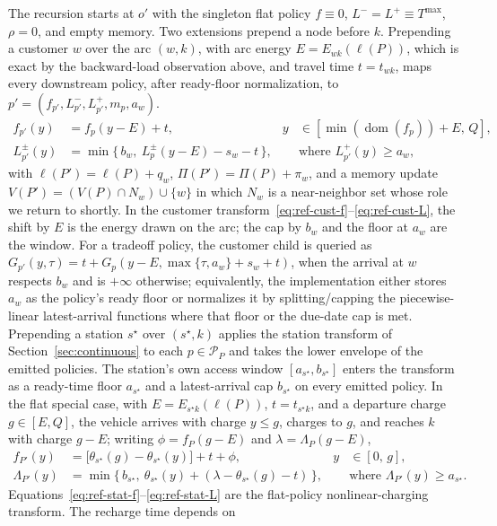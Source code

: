 \documentclass[review,3p,authoryear]{elsarticle}
\theoremstyle{plain}
\theoremstyle{definition}
\theoremstyle{remark}
\newcommand{\dom}{\operatorname{dom}}
\newcommand{\Tmax}{T^{\max}}
\begin{document}
The recursion starts at $o'$ with the singleton flat policy
$f\equiv0$, $L^-=L^+\equiv\Tmax$, $\rho=0$, and empty memory. Two extensions prepend
a node before $k$. Prepending a customer $w$ over the arc $(w,k)$, with arc energy
$E=E_{wk}(\ell(P))$, which is exact by the backward-load observation above, and
travel time $t=t_{wk}$, maps every downstream policy, after ready-floor
normalization, to
$p'=(f_{p'},L_{p'}^-,L_{p'}^+,m_p,a_w)$.
\begin{align}
f_{p'}(y) &= f_p(y-E) + t, & y &\in [\min(\dom(f_p))+E,\,Q],\label{eq:ref-cust-f}\\
L_{p'}^\pm(y) &= \min\{\,b_w,\ L_p^\pm(y-E)-s_w-t\,\}, &&\text{where } L_{p'}^+(y)\ge a_w,
  \label{eq:ref-cust-L}
\end{align}
with $\ell(P')=\ell(P)+q_w$, $\Pi(P')=\Pi(P)+\pi_w$, and a memory update
$V(P')=(V(P)\cap N_w)\cup\{w\}$ in which $N_w$ is a near-neighbor set whose role we
return to shortly. In the customer transform~\eqref{eq:ref-cust-f}--\eqref{eq:ref-cust-L},
the shift by $E$ is the energy drawn on the arc; the cap by $b_w$
and the floor at $a_w$ are the window. For a tradeoff policy, the customer child is
queried as $G_{p'}(y,\tau)=t+G_p(y-E,\max\{\tau,a_w\}+s_w+t)$, when the arrival at $w$ respects $b_w$ and is $+\infty$ otherwise; equivalently, the
implementation either stores $a_w$ as the policy's ready floor or normalizes it by
splitting/capping the piecewise-linear latest-arrival functions where that floor
or the due-date cap is met. Prepending a station $s^\star$ over
$(s^\star,k)$ applies the station
transform of Section~\ref{sec:continuous} to each $p\in\mathcal P_P$ and takes the
lower envelope of the emitted policies. The station's own access window
$[a_{s^\star},b_{s^\star}]$ enters the transform as a ready-time floor $a_{s^\star}$ and
a latest-arrival cap $b_{s^\star}$ on every emitted policy. In the
flat special case, with $E=E_{s^\star k}(\ell(P))$, $t=t_{s^\star k}$, and a
departure charge $g\in[E,Q]$, the vehicle arrives with charge \(y\le g\), charges to
$g$, and reaches $k$ with charge $g-E$; writing $\phi=f_P(g-E)$ and
$\lambda=\Lambda_P(g-E)$,
\begin{align}
f_{P'}(y) &= \bigl[\theta_{s^\star}(g)-\theta_{s^\star}(y)\bigr]+t+\phi,
  & y &\in[0,\,g],\label{eq:ref-stat-f}\\
\Lambda_{P'}(y) &= \min\{\,b_{s^\star},\ \theta_{s^\star}(y)+(\lambda-\theta_{s^\star}(g)-t)\,\},
  &&\text{where } \Lambda_{P'}(y)\ge a_{s^\star}.\label{eq:ref-stat-L}
\end{align}
Equations~\eqref{eq:ref-stat-f}--\eqref{eq:ref-stat-L} are the flat-policy nonlinear-charging transform. The recharge time depends on
\end{document}
